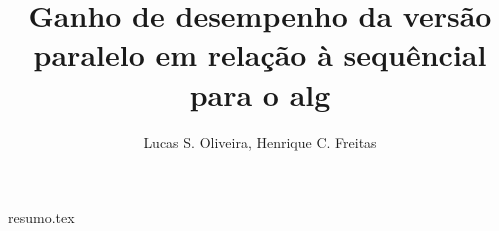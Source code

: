 \documentclass[12pt]{article}
\title{Ganho de desempenho da versão paralelo em relação à sequêncial para o alg }
\author{{Lucas S. Oliveira\inst{1}, Henrique C. Freitas\inst{1}}}
\begin{document}
 

\maketitle

{resumo.tex}
\end{document}
